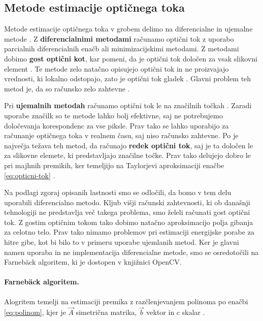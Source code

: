 \subsection{Metode estimacije optičnega toka}

Metode estimacije optičnega toka v grobem delimo na diferencialne in {ujemalne} metode \cite{trucco1998introductory}. Z \textbf{diferencialnimi metodami} računamo optični tok z uporabo parcialnih diferencialnih enačb ali minimizacijskimi metodami. Z metodami dobimo \textbf{gost optični kot}, kar pomeni, da je optični tok določen za vsak slikovni element \cite{trucco1998introductory}. Te metode zelo natačno opisujejo optični tok in ne proizvajajo vrednosti, ki lokalno odstopajo, zato je optični tok gladek \cite{brox2011large}.  Glavni problem teh metod je, da so računsko zelo zahtevne \cite{trucco1998introductory}.

Pri \textbf{ujemalnih metodah} računamo optični tok le na značilnih točkah \cite{trucco1998introductory}. Zaradi uporabe značilk so te metode lahko bolj efektivne, saj ne potrebujemo določevanja korespondenc za vse piksle. Prav tako se lahko uporabijo za računanje optičnega toka v realnem času, saj niso računsko zahtevne. Po \cite{trucco1998introductory} je največja težava teh metod, da računajo \textbf{redek optični tok}, saj je ta določen le za slikovne elemete, ki predstavljajo značilne točke. Prav tako delujejo dobro le pri majhnih premikih, ker temeljijo na Taylorjevi aproksimaciji enačbe \eqref{eq:opticni-tok} \cite{wedel2011stereo}. 

Na podlagi zgoraj opisanih lastnosti smo se odločili, da bomo v tem delu uporabili diferencialno metodo. Kljub višji računski zahtevnosti, ki ob današnji tehnologiji ne predstavlja več takega problema, smo želeli računati gost optični tok. Z gostim optičnim tokom tako dobimo natačno aproksimacijo polja gibanja za celotno telo. Prav tako nimamo problemov pri estimaciji energijske porabe za hitre gibe, kot bi bilo to v primeru uporabe ujemlanih metod. Ker je glavni namen uporaba in ne implementacija diferencialne metode, smo se osredotočili na Farneb{\"a}ck algoritem, ki je dostopen v knjižnici OpenCV.

\paragraph{Farneb{\"a}ck algoritem.}
Alogritem temelji na estimaciji premika z razčlenjevanjem polinoma  po enačbi \eqref{eq:polinom}, kjer je $\vec{A}$ simetrična matrika, $\vec{b}$ vektor in $c$ skalar \cite{farneback2003two}.

